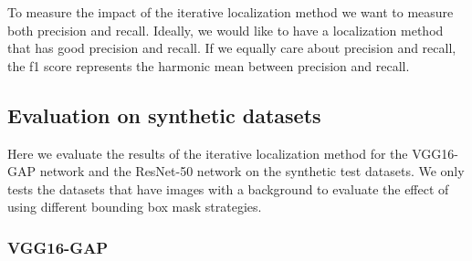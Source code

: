 To measure the impact of the iterative localization method we want to measure both precision and recall. Ideally, we would like to have a localization method that has good precision and recall. If we equally care about precision and recall, the f1 score represents the harmonic mean between precision and recall.

\subsection{Evaluation on synthetic datasets}
Here we evaluate the results of the iterative localization method for the VGG16-GAP network and the ResNet-50 network on the synthetic test datasets. We only tests the datasets that have images with a background to evaluate the effect of using different bounding box mask strategies.

\subsubsection{VGG16-GAP}

